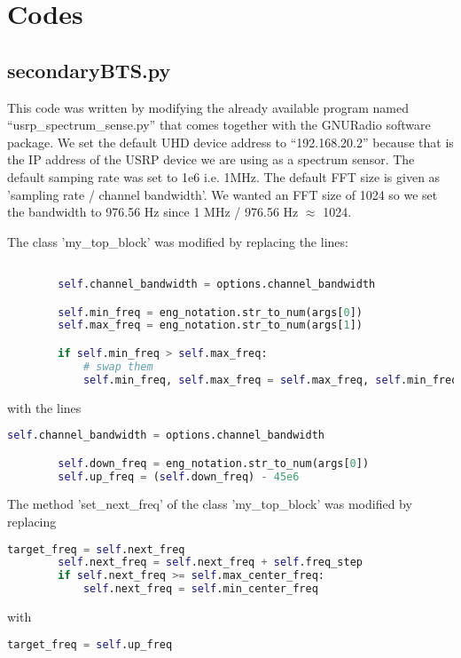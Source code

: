 \chapter{Codes}

\section{secondaryBTS.py}

This code was written by modifying the already available program named 
``usrp\_spectrum\_sense.py'' that comes together with the GNURadio software
package. We set the default UHD device address to ``192.168.20.2'' because 
that is the IP address of the USRP device we are using as a spectrum sensor.
The default samping rate was set to 1e6 i.e. 1MHz. The default FFT size is
given as 'sampling rate / channel bandwidth'. We wanted an FFT size of 1024 so
we set the bandwidth to 976.56 Hz since 1 MHz / 976.56 Hz $\approx$ 1024.

The class 'my\_top\_block' was modified by replacing the lines:
\begin{lstlisting}[language=Python]

        self.channel_bandwidth = options.channel_bandwidth

        self.min_freq = eng_notation.str_to_num(args[0])
        self.max_freq = eng_notation.str_to_num(args[1])

        if self.min_freq > self.max_freq:
            # swap them
            self.min_freq, self.max_freq = self.max_freq, self.min_freq    
\end{lstlisting}
with the lines
\begin{lstlisting}[language=Python]
        self.channel_bandwidth = options.channel_bandwidth

        self.down_freq = eng_notation.str_to_num(args[0])
        self.up_freq = (self.down_freq) - 45e6    
\end{lstlisting}

The method 'set\_next\_freq' of the class 'my\_top\_block' was modified by
replacing
\begin{lstlisting}[language=Python]
        target_freq = self.next_freq
        self.next_freq = self.next_freq + self.freq_step
        if self.next_freq >= self.max_center_freq:
            self.next_freq = self.min_center_freq
\end{lstlisting}
with
\begin{lstlisting}[language=Python]
        target_freq = self.up_freq
\end{lstlisting}




